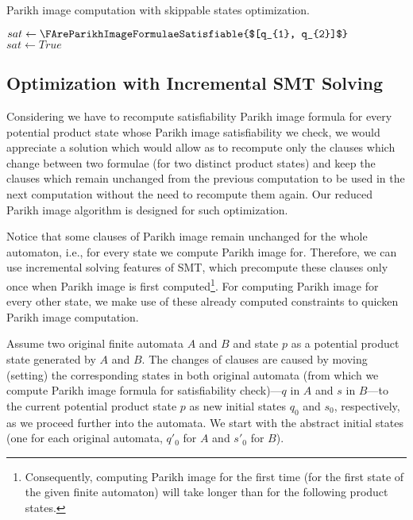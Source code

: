 
\begin{algorithm}
\caption{Parikh image computation with skippable states optimization.}\label{productConstructionParikhImageAlgorithmAddingSkippableStates}
\DontPrintSemicolon
\BlankLine
     {
        $sat \gets \FAreParikhImageFormulaeSatisfiable{$[q_{1}, q_{2}]$}$ \;
    } {\label{AlgIsSkippable} %
        $sat \gets True$ \;
    }
\end{algorithm}\DecMargin{1em}

\subsection{Optimization with Incremental SMT Solving}

Considering we have to recompute satisfiability Parikh image formula for every potential product state whose Parikh image satisfiability we check, we would appreciate a solution which would allow as to recompute only the clauses which change between two formulae (for two distinct product states) and keep the clauses which remain unchanged from the previous computation to be used in the next computation without the need to recompute them again. Our reduced Parikh image algorithm is designed for such optimization.

Notice that some clauses of Parikh image remain unchanged for the whole automaton, i.e., for every state we compute Parikh image for. Therefore, we can use incremental solving features of SMT, which precompute these clauses only once when Parikh image is first computed\footnote{Consequently, computing Parikh image for the first time (for the first state of the given finite automaton) will take longer than for the following product states.}. For computing Parikh image for every other state, we make use of these already computed constraints to quicken Parikh image computation.

Assume two original finite automata $A$ and $B$ and state $p$ as a potential product state generated by $A$ and $B$. The changes of clauses are caused by moving (setting) the corresponding states in both original automata (from which we compute Parikh image formula for satisfiability check)---$q$ in $A$ and $s$ in $B$---to the current potential product state $p$ as new initial states $q_0$ and $s_0$, respectively, as we proceed further into the automata. We start with the abstract initial states (one for each original automata, $q'_0$ for $A$ and $s'_0$ for $B$).

